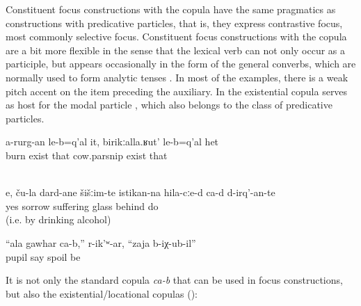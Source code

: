 Constituent focus constructions with the copula have the same pragmatics as constructions with predicative particles, that is, they express contrastive focus, most commonly selective focus. Constituent focus constructions with the copula are a bit more flexible in the sense that the lexical verb can not only occur as a participle, but appears occasionally in the form of the general converbs, which are normally used to form analytic tenses . In most of the examples, there is a weak pitch accent on the item preceding the auxiliary. In  the existential copula serves as host for the modal particle , which also belongs to the class of predicative particles.


\begin{exe}
	\ex	\label{ex:There is the one that does not burn, the cow-parsnip@25}
	\gll	a-rurg-an	le-b=q'al	it,	birikːalla.ʁut'	le-b=q'al	het\\
		burn	exist	that	cow.parsnip	exist	that\\
	\glt	{}

	\\\label{ex:Yes, they resolve their sorrows BEHIND THE GLASS@25b}
	\gll	e,	ču-la	dard-ane	šišːim-te	istikan-na	hila-cːe-d	ca-d 		d-irq'-an-te\\
		yes		sorrow	suffering	glass	behind		 	do\\
	\glt	{} (i.e. by drinking alcohol)
	
		\ex	\label{ex:‎Your pupil is spoiled, she said}
	\gll	``ala	gawhar	ca-b,''	r-ik'ʷ-ar, ``zaja	b-iχ-ub-il''\\
			pupil		say	spoil	be\\
	\glt	{}
\end{exe}

It is not only the standard copula \textit{ca-b} that can be used in focus constructions, but also the existential/locational copulas ():

